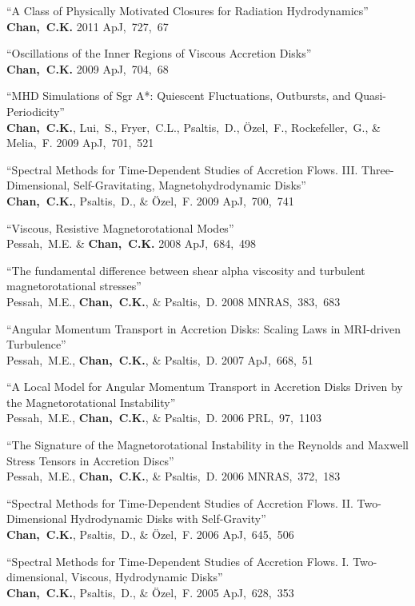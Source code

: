 \begin{ilist}
\item ``A Class of Physically Motivated Closures for Radiation Hydrodynamics''\\
  \textbf{Chan,~C.K.}
  2011 ApJ,~727,~67

\item ``Oscillations of the Inner Regions of Viscous Accretion Disks''\\
  \textbf{Chan,~C.K.}
  2009 ApJ,~704,~68

\item ``MHD Simulations of Sgr A*: Quiescent Fluctuations, Outbursts, and Quasi-Periodicity''\\
  \textbf{Chan,~C.K.}, Lui,~S., Fryer,~C.L., Psaltis,~D., \"Ozel,~F., Rockefeller,~G., \& Melia,~F.
  2009 ApJ,~701,~521

\item ``Spectral Methods for Time-Dependent Studies of Accretion Flows.
  III. Three-Dimensional, Self-Gravitating, Magnetohydrodynamic Disks''\\
  \textbf{Chan,~C.K.}, Psaltis,~D., \& \"Ozel,~F.
  2009 ApJ,~700,~741

\item ``Viscous, Resistive Magnetorotational Modes''\\
  Pessah,~M.E. \& \textbf{Chan,~C.K.}
  2008 ApJ,~684,~498

\item ``The fundamental difference between shear alpha viscosity and turbulent magnetorotational stresses''\\
  Pessah,~M.E., \textbf{Chan,~C.K.}, \& Psaltis,~D.
  2008 MNRAS,~383,~683

\item ``Angular Momentum Transport in Accretion Disks: Scaling Laws in MRI-driven Turbulence''\\
  Pessah,~M.E., \textbf{Chan,~C.K.}, \& Psaltis,~D.
  2007 ApJ,~668,~51

\item ``A Local Model for Angular Momentum Transport in Accretion Disks Driven by the Magnetorotational Instability''\\
  Pessah,~M.E., \textbf{Chan,~C.K.}, \& Psaltis,~D.
  2006 PRL,~97,~1103

\item ``The Signature of the Magnetorotational Instability in the Reynolds and Maxwell Stress Tensors in Accretion Discs''\\
  Pessah,~M.E., \textbf{Chan,~C.K.}, \& Psaltis,~D.
  2006 MNRAS,~372,~183

\item ``Spectral Methods for Time-Dependent Studies of Accretion Flows.
  II. Two-Dimensional Hydrodynamic Disks with Self-Gravity''\\
  \textbf{Chan,~C.K.}, Psaltis,~D., \& \"Ozel,~F.
  2006 ApJ,~645,~506

\item ``Spectral Methods for Time-Dependent Studies of Accretion Flows.
  I. Two-dimensional, Viscous, Hydrodynamic Disks''\\
  \textbf{Chan,~C.K.}, Psaltis,~D., \& \"Ozel,~F.
  2005 ApJ,~628,~353

\end{ilist}
